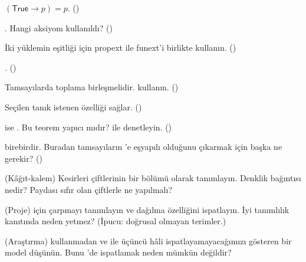 \begin{alistirmalar}
 $(\mathsf{True} \to p) = p$. ()

 . Hangi aksiyom
kullanıldı? ()

 İki yüklemin eşitliği için propext ile funext'i birlikte
kullanın. ()

 .
()

 Tamsayılarda toplama birleşmelidir. 
kullanın. ()

 Seçilen tanık istenen özelliği sağlar. ()

  ise . Bu teorem yapıcı mıdır?
  ile denetleyin. ()

  birebirdir. Buradan tamsayıların
'e eşyapılı olduğunu çıkarmak için başka ne gerekir? ()

 (Kâğıt-kalem) Kesirleri  çiftlerinin bir bölümü
olarak tanımlayın. Denklik bağıntısı nedir? Paydası sıfır olan çiftlerle ne
yapılmalı?

 (Proje)  için çarpmayı tanımlayın ve dağılma
özelliğini ispatlayın. İyi tanımlılık kanıtında  neden yetmez?
(İpucu: doğrusal olmayan terimler.)

 (Araştırma)  kullanmadan  ve
 ile üçüncü hâli ispatlayamayacağımızı gösteren bir model
düşünün. Bunu \Lean{}'de ispatlamak neden mümkün değildir?
\end{alistirmalar}
